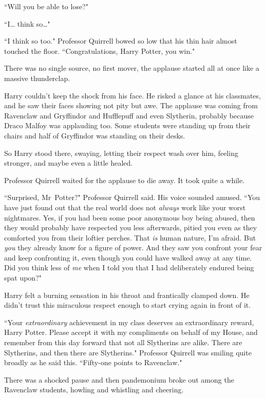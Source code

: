 ``Will you be able to lose?"

``I{\ldots} think so{\ldots}"

``I think so too." Professor Quirrell bowed so low that his thin hair almost touched the floor. ``Congratulations, Harry Potter, you win."

There was no single source, no first mover, the applause started all at once like a massive thunderclap.

Harry couldn't keep the shock from his face. He risked a glance at his classmates, and he saw their faces showing not pity but awe. The applause was coming from Ravenclaw and Gryffindor and Hufflepuff and even Slytherin, probably because Draco Malfoy was applauding too. Some students were standing up from their chairs and half of Gryffindor was standing on their desks.

So Harry stood there, swaying, letting their respect wash over him, feeling stronger, and maybe even a little healed.

Professor Quirrell waited for the applause to die away. It took quite a while.

``Surprised, Mr~Potter?" Professor Quirrell said. His voice sounded amused. ``You have just found out that the real world does not \emph{always} work like your worst nightmares. Yes, if you had been some poor anonymous boy being abused, then they would probably have respected you less afterwards, pitied you even as they comforted you from their loftier perches. That \emph{is} human nature, I'm afraid. But \emph{you} they already know for a figure of power. And they saw you confront your fear and keep confronting it, even though you could have walked away at any time. Did you think less of \emph{me} when I told you that I had deliberately endured being spat upon?"

Harry felt a burning sensation in his throat and frantically clamped down. He didn't trust this miraculous respect enough to start crying again in front of it.

``Your \emph{extraordinary} achievement in my class deserves an extraordinary reward, Harry Potter. Please accept it with my compliments on behalf of my House, and remember from this day forward that not all Slytherins are alike. There are Slytherins, and then there are Slytherins." Professor Quirrell was smiling quite broadly as he said this. ``Fifty-one points to Ravenclaw."

There was a shocked pause and then pandemonium broke out among the Ravenclaw students, howling and whistling and cheering.

